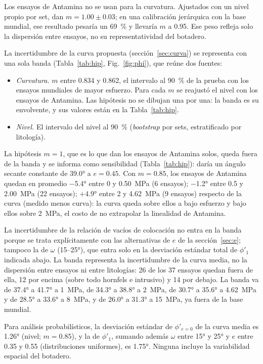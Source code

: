 \documentclass[11pt,letterpaper]{article}
\begin{document}
Los ensayos de Antamina no se usan para la curvatura. Ajustados con un nivel propio por set, dan $m = 1.00 \pm 0.03$; en una calibración jerárquica con la base mundial, ese resultado pesaría un 69~\% y llevaría $m$ a 0.95. Ese peso refleja solo la dispersión entre ensayos, no su representatividad del botadero.

La incertidumbre de la curva propuesta (sección~\ref{sec:curva}) se representa con una sola banda (Tabla~\ref{tab:hip}, Fig.~\ref{fig:phi}), que reúne dos fuentes:
\begin{itemize}
\item \emph{Curvatura.} $m$ entre 0.834 y 0.862, el intervalo al 90~\% de la prueba con los ensayos mundiales de mayor esfuerzo. Para cada $m$ se reajustó el nivel con los ensayos de Antamina. Las hipótesis no se dibujan una por una: la banda es su envolvente, y sus valores están en la Tabla~\ref{tab:hip}.
\item \emph{Nivel.} El intervalo del nivel al 90~\% (\emph{bootstrap} por sets, estratificado por litología).
\end{itemize}
La hipótesis $m = 1$, que es lo que dan los ensayos de Antamina solos, queda fuera de la banda y se informa como sensibilidad (Tabla~\ref{tab:hip}): daría un ángulo secante constante de 39.0° a $e = 0.45$. Con $m = 0.85$, los ensayos de Antamina quedan en promedio $-$5.4° entre 0 y 0.50~MPa (6 ensayos); $-$1.2° entre 0.5 y 2.00~MPa (22 ensayos); +4.9° entre 2 y 4.62~MPa (9 ensayos) respecto de la curva (medido menos curva): la curva queda sobre ellos a bajo esfuerzo y bajo ellos sobre 2~MPa, el costo de no extrapolar la linealidad de Antamina.

La incertidumbre de la relación de vacíos de colocación no entra en la banda porque se trata explícitamente con las alternativas de $e$ de la sección~\ref{sec:e}; tampoco la de $\omega$ (15--25°), que entra solo en la desviación estándar total de $\phi'_1$ indicada abajo. La banda representa la incertidumbre de la curva media, no la dispersión entre ensayos ni entre litologías: 26 de los 37 ensayos quedan fuera de ella, 12 por encima (sobre todo hornfels e intrusivo) y 14 por debajo. La banda va de 37.4° a 41.7° a 1~MPa, de 34.3° a 38.8° a 2~MPa, de 30.7° a 35.6° a 4.62~MPa y de 28.5° a 33.6° a 8~MPa, y de 26.0° a 31.3° a 15~MPa, ya fuera de la base mundial.

Para análisis probabilísticos, la desviación estándar de $\phi'_{e=0}$ de la curva media es 1.26° (nivel; $m = 0.85$), y la de $\phi'_1$, sumando además $\omega$ entre 15° y 25° y $e$ entre 0.35 y 0.55 (distribuciones uniformes), es 1.75°. Ninguna incluye la variabilidad espacial del botadero.
\end{document}
